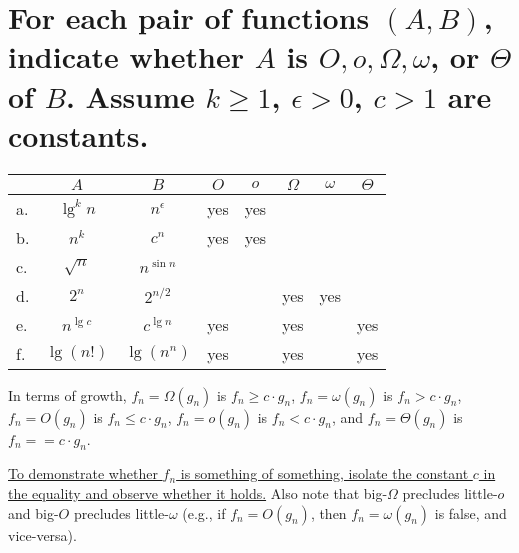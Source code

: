 \section[Problem 5]{For each pair of functions $(A, B)$, indicate whether $A$ is $O, o, \Omega, \omega$, or $\Theta$ of $B$. Assume $k \geq 1$, $\epsilon > 0$, $c > 1$ are constants.}

\begin{center}
	\begin{tabular}{lcc|c|c|c|c|c}
		& $A$ & $B$ & $O$ & $o$ & $\Omega$ & $\omega$ & $\Theta$ \\ \hline
		a. & $\lg^k n$ & $n^{\epsilon}$ & yes & yes &  &  &  \\ \hline
		b. & $n^k$ & $c^n$				& yes & yes &  &  &  \\ \hline
		c. & $\sqrt{n}$ & $n^{\sin n}$	&  &  &  &  &  \\ \hline
		d. & $2^n$ & $2^{n/2}$			&  &  & yes & yes &  \\ \hline
		e. & $n^{\lg c}$ & $c^{\lg n}$	& yes &  & yes &  & yes \\ \hline
		f. & $\lg(n!)$ & $\lg(n^n)$		& yes &  & yes &  & yes 
	\end{tabular}
\end{center}

\noindent
In terms of growth,
$f_n = \Omega(g_n)$ is	$f_n \geq c \cdot g_n$,
$f_n = \omega(g_n)$ is	$f_n > c \cdot g_n$,
$f_n = O(g_n)$ is		$f_n \leq c \cdot g_n$,
$f_n = o(g_n)$ is		$f_n < c \cdot g_n$, and
$f_n = \Theta(g_n)$ is	$f_n == c \cdot g_n$.

\ul{To demonstrate whether $f_n$ is something of something, isolate the constant $c$ in the equality and observe whether it holds.} Also note that big-$\Omega$ precludes little-$o$ and big-$O$ precludes little-$\omega$ (e.g., if $f_n = O(g_n)$, then $f_n = \omega(g_n)$ is false, and vice-versa).
